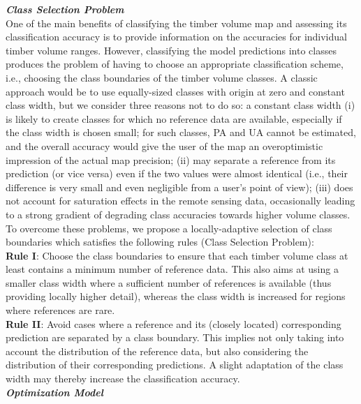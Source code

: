 \textit{\textbf{Class Selection Problem}}\\

One of the main benefits of classifying the timber volume map and assessing its classification accuracy is to provide information on the accuracies for individual timber volume ranges. However, classifying the model predictions into classes produces the problem of having to choose an appropriate classification scheme, i.e., choosing the class boundaries of the timber volume classes. A classic approach would be to use equally-sized classes with origin at zero and constant class width, but we consider three reasons not to do so: a constant class width (i) is likely to create classes for which no reference data are available, especially if the class width is chosen small; for such classes, PA and UA cannot be estimated, and the overall accuracy would give the user of the map an overoptimistic impression of the actual map precision; (ii) may separate a reference from its prediction (or vice versa) even if the two values were almost identical (i.e., their difference is very small and even negligible from a user's point of view); (iii) does not account for saturation effects in the remote sensing data, occasionally leading to a strong gradient of degrading class accuracies towards higher volume classes. To overcome these problems, we propose a locally-adaptive selection of class boundaries which satisfies the following rules (Class Selection Problem):\\

\textbf{Rule I}: Choose the class boundaries to ensure that each timber volume class at least contains a minimum number of reference data. This also aims at using a smaller class width where a sufficient number of references is available (thus providing locally higher detail), whereas the class width is increased for regions where references are rare.\\

\textbf{Rule II}: Avoid cases where a reference and its (closely located) corresponding prediction are separated by a class boundary. This implies not only taking into account the distribution of the reference data, but also considering the distribution of their corresponding predictions. A slight adaptation of the class width may thereby increase the classification accuracy.\\

\textit{\textbf{Optimization Model}}\\

